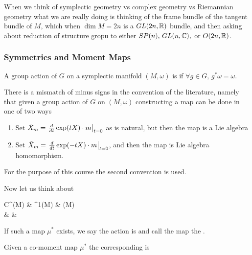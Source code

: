 \documentclass{article}
\begin{document}
\begin{remark}
	When we think of symplectic geometry vs complex geometry vs Riemannian geometry what we are really doing is thinking of the frame bundle of the tangent bundle of $M$, which when $\dim M = 2n$ is a $GL(2n,\mathbb{R})$ bundle, and then asking about reduction of structure gropu to either $SP(n), \, GL(n,\mathbb{C}),$ or $O(2n,\mathbb{R})$.  
\end{remark}


\subsubsection{Symmetries and Moment Maps}
\begin{definition}
	A group action of $G$ on a symplectic manifold $(M,\omega)$ is  if $\forall g \in G, \, g^\ast \omega = \omega$. 
\end{definition}
\begin{remark}
There is a mismatch of minus signs in the convention of the literature, namely that given a group action of $G$ on $(M,\omega)$ constructing a map 
can be done in one of two ways 
\begin{enumerate}
	\item Set $\tilde{X}_m = \left. \frac{d}{dt} \exp(tX) \cdot m \right\rvert_{t=0}$ as is natural, but then the map is a Lie algebra 
	\item Set $\tilde{X}_m = \left. \frac{d}{dt} \exp(-tX) \cdot m \right\rvert_{t=0}$, and then the map is  Lie algebra homomorphism. 
\end{enumerate}
For the purpose of this course the second convention is used.
\end{remark}



Now let us think about 
\begin{tkz}
	C^\infty(M) \arrow[r,"d"] & \Omega^1(M) \arrow[r] & (M) \\
	  \arrow[rru] & &
\end{tkz}
\begin{definition}
	If such a map $\mu^\ast$ exists, we say the action is  and call the map the .
\end{definition}
\begin{definition}
	Given a co-moment map $\mu^\ast$ the corresponding  is 
\end{definition}
\end{document}
